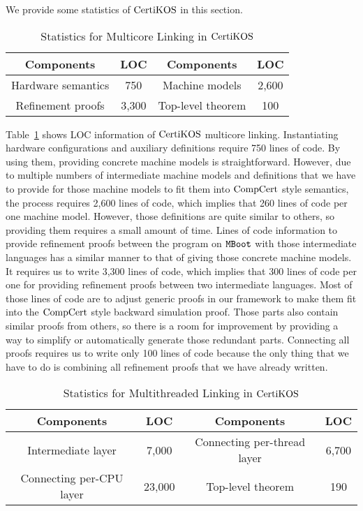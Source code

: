 We provide some statistics of $\mathrm{CertiKOS}$ in this section. 
\begin{table}
\begin{center}
\renewcommand{\arraystretch}{1.1}
\setlength{\tabcolsep}{0.3em}
\begin{tabular}{|c|c||c|c|}
\hline
Components  & LOC & Components  & LOC \\
\hline
\hline
Hardware semantics & 750 &
Machine models & 2,600 \\ 
\hline
Refinement proofs & 3,300 & Top-level theorem & 100\\ 
\hline
\end{tabular}
\end{center}
\caption{Statistics for Multicore Linking in $\mathrm{CertiKOS}$}
\label{table:multicore-evaluation}
\hrulefill
\end{table}
Table~\ref{table:multicore-evaluation} shows LOC information of $\mathrm{CertiKOS}$ multicore linking.
Instantiating hardware configurations and auxiliary definitions require 750 lines of code. 
By using them, providing concrete machine models is straightforward.
However, due to multiple numbers of intermediate machine models and  definitions that we have to provide for those machine models to fit them into $\mathrm{CompCert}$ style semantics, the process requires 2,600 lines of code, which implies that 260 lines of code per one machine model.
However, those definitions are quite similar to others, so providing them requires a small amount of time. 
Lines of code information to provide refinement proofs between the program on ${\mathrm{\texttt{MBoot}}}$ with those intermediate languages has a similar manner to that of giving those concrete machine models. 
It requires us to write 3,300 lines of code, which implies that 300 lines of code per one for providing refinement proofs between two intermediate languages. 
Most of those lines of code are to adjust generic proofs in our framework to make them fit into the $\mathrm{CompCert}$ style backward simulation proof. 
Those parts also contain similar proofs from others, so there is a room for improvement by providing a way to simplify or automatically generate those redundant parts. 
Connecting all proofs requires us to write only 100 lines of code because the only thing that we have to do is combining all refinement proofs that we have already written. 
\begin{table}
\begin{center}
\renewcommand{\arraystretch}{1.1}
\setlength{\tabcolsep}{0.3em}
\begin{tabular}{|c|c||c|c|}
\hline
Components  & LOC & Components  & LOC \\
\hline
\hline
Intermediate layer & 7,000 &
Connecting per-thread layer & 6,700 \\ 
\hline
Connecting per-CPU layer & 23,000 & Top-level theorem & 190\\ 
\hline
\end{tabular}
\end{center}
\caption{Statistics for Multithreaded Linking in $\mathrm{CertiKOS}$}
\label{table:multithreaded-evaluation}
\hrulefill
\end{table}
